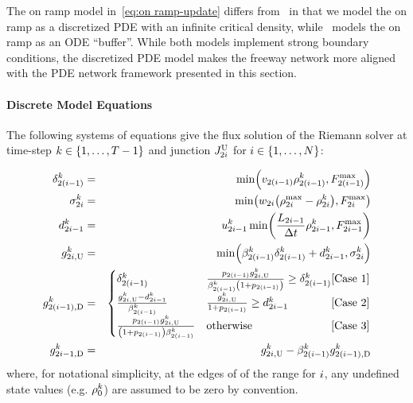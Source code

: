 The on ramp model in~\eqref{eq:on ramp-update} differs from~\cite{delle2014pde}
in that we model the on ramp as a discretized PDE with an infinite
critical density, while~\cite{delle2014pde} models the on ramp
as an ODE ``buffer''. While both models implement strong boundary
conditions, the discretized PDE model makes the freeway network more
aligned with the PDE network framework presented in this section.

\paragraph{Discrete Model Equations}



The following systems of equations give the flux
solution of the Riemann solver at time-step $k\in\intrange 1{\ntime-1}$
and junction $J_{2i}^{\text{U}}$ for $\link\in\intrange 1{\nlinks}$:

\begin{eqnarray}
\demand_{2\left(\link-1\right)}^{\tind} & = & \min\left(\ffspeed_{2\left(i-1\right)}\densitydiscrete{2\left(\link-1\right)}{\tind},F_{2\left(\link-1\right)}^{\max}\right)\label{eq:first-ramp}\\
\supply_{2\link}^{\tind} & = & \min\left(\congspeed_{2i}\left(\density_{2i}^{\max}-\densitydiscrete{2\link}{\tind}\right),F_{2i}^{\max}\right)\label{eq:supply}\\
\rampDemand_{2\link-1}^{\tind} & = & \ramp_{2\link-1}^{\tind}\min\left(\frac{\length_{2\link-1}}{\Delta t}\densitydiscrete{2\link-1}{\tind},F_{2i-1}^{\max}\right)\label{eq:ramp-eqn}\\
\fin{2\link}{\tind} & = & \min\left(\splitratio_{2\left(\link-1\right)}^{\tind}\demand_{2\left(\link-1\right)}^{\tind}+\rampDemand_{2\link-1}^{\tind},\supply_{2\link}^{\tind}\right)\label{eq:fin}\\
\fout{2\left(\link-1\right)}{\tind} & = & \begin{cases}
\demand_{2\left(\link-1\right)}^{\tind} & \frac{p_{2(\link-1)}\fin{2\link}{\tind}}{\splitratio_{2\left(\link-1\right)}^{\tind}\left(1+p_{2(\link-1)}\right)}\ge\demand_{2\left(\link-1\right)}^{\tind}\hfill\text{[Case 1]}\\
\frac{\fin{2\link}{\tind}-\rampDemand_{2\link-1}^{\tind}}{\splitratio_{2\left(\link-1\right)}^{\tind}} & \frac{\fin{2\link}{\tind}}{1+p_{2(\link-1)}}\ge\rampDemand_{2\link-1}^{\tind}\hfill\text{[Case 2}]\\
\frac{p_{2(\link-1)}\fin{2\link}{\tind}}{\left(1+p_{2(\link-1)}\right)\splitratio_{2\left(\link-1\right)}^{\tind}} & \text{otherwise}\hfill[\text{Case 3]}
\end{cases}\label{eq:merge}\\
\fout{2\link-1}{\tind} & = & \fin{2\link}{\tind}-\splitratio_{2\left(\link-1\right)}^{\tind}\fout{2\left(\link-1\right)}{\tind}\label{eq:last-ramp}
\end{eqnarray}
where, for notational simplicity, at the edges of of the range for
$i$, any undefined state values (e.g. $\rho_{0}^{k}$)
are assumed to be zero by convention. 

